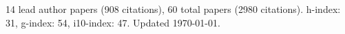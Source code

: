 14 lead author papers (908 citations),
60 total papers (2980 citations).\newline
h-index: 31, g-index: 54, i10-index: 47. Updated \today.